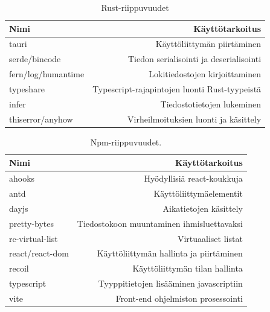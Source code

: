 \documentclass[a4paper,12pt]{article}
\begin{document}
    \begin{table}[h!]
        \centering
        \caption{Rust-riippuvuudet}
        \label{tab:cargo_dependencies}
        \begin{tabularx}{\textwidth}{|X|r|}
        \hline
            \textbf{Nimi}      & \textbf{Käyttötarkoitus}            \\ \hline
            tauri              & Käyttöliittymän piirtäminen                                   \\ \hline
            serde/bincode      & Tiedon serialisointi ja deserialisointi                       \\ \hline
            fern/log/humantime & Lokitiedostojen kirjoittaminen                                \\ \hline
            typeshare          & Typescript-rajapintojen luonti Rust-tyypeistä \\ \hline
            infer              & Tiedostotietojen lukeminen                                    \\ \hline
            thiserror/anyhow   & Virheilmoituksien luonti ja käsittely \\ \hline
        \end{tabularx}
    \end{table}


    \begin{table}[h!]
        \centering
        \caption{Npm-riippuvuudet.}
        \label{tab:npm_dependencies}
        \begin{tabularx}{\textwidth}{|X|r|}
        \hline
            \textbf{Nimi}            & \textbf{Käyttötarkoitus}                           \\ \hline
            ahooks          & Hyödyllisiä react-koukkuja                \\ \hline
            antd            & Käyttöliittymäelementit                  \\ \hline
            dayjs           & Aikatietojen käsittely                   \\ \hline
            pretty-bytes    & Tiedostokoon muuntaminen ihmisluettavaksi \\ \hline
            rc-virtual-list & Virtuaaliset listat                       \\ \hline
            react/react-dom & Käyttöliittymän hallinta ja piirtäminen   \\ \hline
            recoil          & Käyttöliittymän tilan hallinta            \\ \hline
            typescript      & Tyyppitietojen lisääminen javascriptiin   \\  \hline
            vite            & Front-end ohjelmiston prosessointi \\ \hline
        \end{tabularx}
    \end{table}
\end{document}
